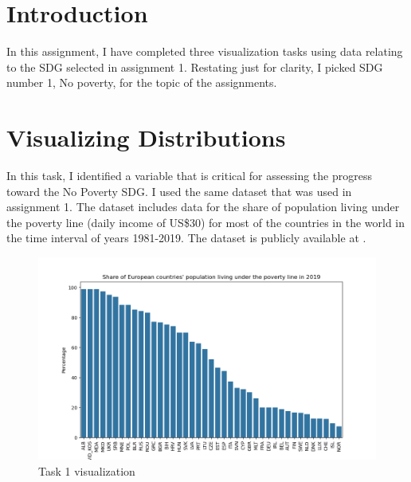 \documentclass[11pt,a4paper,titlepage]{article}
\begin{document}



\section*{Introduction}
In this assignment, I have completed three visualization tasks using data relating to the SDG selected in assignment 1. Restating just for clarity, I picked SDG number 1, No poverty, for the topic of the assignments.

\section{Visualizing Distributions}
In this task, I identified a variable that is critical for assessing the progress toward the No Poverty SDG. I used the same dataset that was used in assignment 1. The dataset includes data for the share of population living under the poverty line (daily income of US\$30) for most of the countries in the world in the time interval of years 1981-2019. The dataset is publicly available at \cite{data}.

\begin{figure}[h]
    \centering
    \includegraphics[width=1.0\linewidth]{reports/assignment-2/imgs/assignment2-1.png}
    \caption{Task 1 visualization}
    \label{fig:viz1}
\end{figure}
\end{document}
